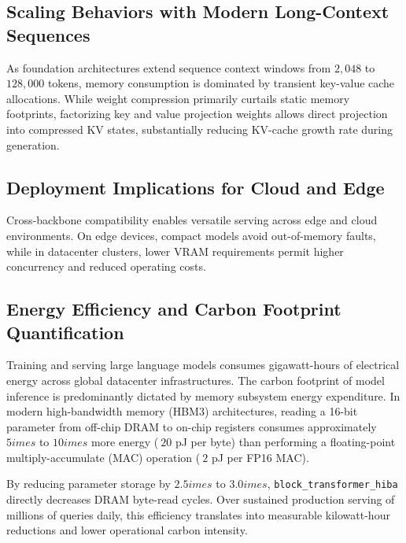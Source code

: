 \subsection{Scaling Behaviors with Modern Long-Context Sequences}
As foundation architectures extend sequence context windows from $2{,}048$ to $128{,}000$ tokens, memory consumption is dominated by transient key-value cache allocations. While weight compression primarily curtails static memory footprints, factorizing key and value projection weights allows direct projection into compressed KV states, substantially reducing KV-cache growth rate during generation.

\subsection{Deployment Implications for Cloud and Edge}
Cross-backbone compatibility enables versatile serving across edge and cloud environments. On edge devices, compact models avoid out-of-memory faults, while in datacenter clusters, lower VRAM requirements permit higher concurrency and reduced operating costs.

\subsection{Energy Efficiency and Carbon Footprint Quantification}
Training and serving large language models consumes gigawatt-hours of electrical energy across global datacenter infrastructures. The carbon footprint of model inference is predominantly dictated by memory subsystem energy expenditure. In modern high-bandwidth memory (HBM3) architectures, reading a 16-bit parameter from off-chip DRAM to on-chip registers consumes approximately $5	imes$ to $10	imes$ more energy ($~20$ pJ per byte) than performing a floating-point multiply-accumulate (MAC) operation ($~2$ pJ per FP16 MAC).

By reducing parameter storage by $2.5	imes$ to $3.0	imes$, \texttt{block\_transformer\_hiba} directly decreases DRAM byte-read cycles. Over sustained production serving of millions of queries daily, this efficiency translates into measurable kilowatt-hour reductions and lower operational carbon intensity.

